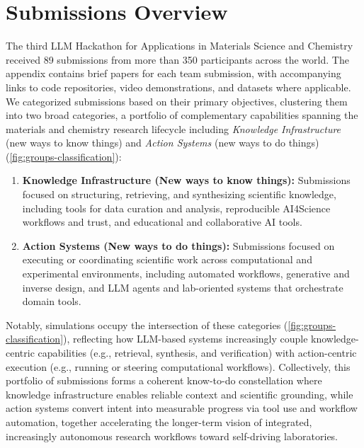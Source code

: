 \documentclass{article}
\begin{document}
\section*{Submissions Overview}
The third LLM Hackathon for Applications in Materials Science and Chemistry received 89 submissions from
more than 350 participants across the world. The appendix contains brief papers for each team submission,
with accompanying links to code repositories, video demonstrations, and datasets where applicable. We
categorized submissions based on their primary objectives, clustering them into two broad categories, a
portfolio of complementary capabilities spanning the materials and chemistry research lifecycle including \emph{Knowledge Infrastructure} (new ways to know things) and \emph{Action Systems} (new ways to do
things) (\autoref{fig:groups-classification}):
\begin{enumerate}
    \item \textbf{Knowledge Infrastructure (New ways to know things):} Submissions focused on structuring,
    retrieving, and synthesizing scientific knowledge, including tools for data curation and analysis, reproducible AI4Science workflows and trust, and educational and collaborative AI tools.
    
    \item \textbf{Action Systems (New ways to do things):} Submissions focused on executing or coordinating
    scientific work across computational and experimental environments, including automated workflows, generative and inverse design, and LLM agents and lab-oriented systems that orchestrate
    domain tools.
\end{enumerate}
Notably, simulations occupy the intersection of these categories (\autoref{fig:groups-classification}), reflecting how LLM-based
systems increasingly couple knowledge-centric capabilities (e.g., retrieval, synthesis, and verification) with
action-centric execution (e.g., running or steering computational workflows). Collectively, this portfolio of
submissions forms a coherent know-to-do constellation where knowledge infrastructure enables reliable context
and scientific grounding, while action systems convert intent into measurable progress via tool use and
workflow automation, together accelerating the longer-term vision of integrated, increasingly autonomous
research workflows toward self-driving laboratories.
\end{document}
